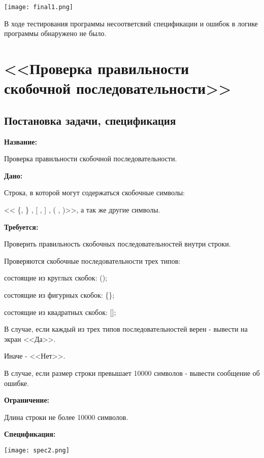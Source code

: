 \documentclass[12pt]{article}
\begin{document}
\vskip 1cm
{
    \centering
    \texttt{[image: final1.png]}
   
    \label{fig:i1}
}



В ходе тестирования программы несоответсвий спецификации и ошибок в логике программы обнаружено не было.






\newpage


\section{<<Проверка правильности скобочной последовательности>>}


\subsection{Постановка задачи, спецификация}

{\bf Название:}

Проверка правильности скобочной последовательности.

{\bf Дано:}

Строка, в которой могут содержаться скобочные символы:

  << \{, \} , [ , ] , ( , )>>, а так же другие символы.

{\bf Требуется:}

Проверить правильность скобочных последовательностей внутри строки.

Проверяются скобочные последовательности трех типов: 

состоящие из круглых скобок: ();

состоящие из фигурных скобок: \{\};

состоящие из квадратных скобок: [];


В случае, если каждый из трех типов последовательностей верен - вывести на экран <<Да>>.

Иначе - <<Нет>>.

В случае, если размер строки превышает 10000 символов - вывести сообщение об ошибке.


{\bf Ограничение:}

Длина строки не более 10000 символов.


{\bf Спецификация:}

\vskip 1cm
{
    \centering
    \texttt{[image: spec2.png]}
   
    \label{fig:i1}
}
\vskip 1cm
\end{document}
